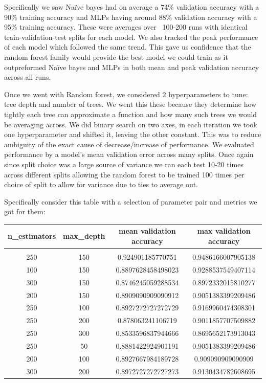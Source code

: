 \documentclass[12pt]{article}
\begin{document}
Specifically we saw Na\"ive bayes had on average a 74\% validation accuracy with a 90\% training accuracy and MLPs having around 88\% validation accuracy with a 95\% training accuracy. These were averages over ~100-200 runs with identical train-validation-test splits for each model. We also tracked the peak performance of each model which followed the same trend. This gave us confidence that the random forest family would provide the best model we could train as it outpreformed Na\"ive bayes and MLPs in both mean and peak validation accuracy across all runs.

Once we went with Random forest, we considered 2 hyperparameters to tune: tree depth and number of trees. We went this these because they determine how tightly each tree can approximate a function and how many such trees we would be averaging across. We did binary search on two axes, in each iteration we took one hyperparameter and shifted it, leaving the other constant. This was to reduce ambiguity of the exact cause of decrease/increase of performance. We evaluated performance by a model's mean validation error across many splits. Once again since split choice was a large source of variance we ran each test 10-20 times across different splits allowing the random forest to be trained 100 times per choice of split to allow for variance due to ties to average out. 

Specifically consider this table with a selection of parameter pair and metrics we got for them:

\begin{tabular}{c|c|c|c}
	n\_estimators & max\_depth & mean validation accuracy & max validation accuracy\\
	\hline & & & \\
	250 & 150 & 0.924901185770751 & 0.9486166007905138\\
	100 & 150 & 0.8897628458498023 & 0.9288537549407114\\
	300 & 150 & 0.8746245059288534 & 0.8972332015810277\\
	200 & 150 & 0.8909090909090912 & 0.9051383399209486\\
	250 & 100 & 0.8927272727272729 & 0.9169960474308301\\
	250 & 200 & 0.878063241106719 & 0.9011857707509882\\
	250 & 300 & 0.8533596837944666 & 0.8695652173913043\\
	250 & 50 & 0.8881422924901191 & 0.9051383399209486\\
	200 & 100 & 0.8927667984189728 & 0.909090909090909\\
	300 & 200 & 0.8972727272727273 & 0.9130434782608695\\

	
\end{tabular}
\end{document}
